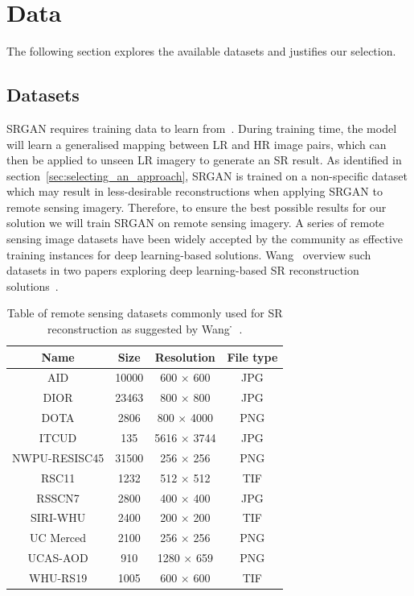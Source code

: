 \section{Data}
The following section explores the available datasets and justifies our selection.

\subsection{Datasets}
SRGAN requires training data to learn from~\cite{srgan}. During training time, the model will learn a generalised mapping between LR and HR image pairs, which can then be applied to unseen LR imagery to generate an SR result. As identified in section~\ref{sec:selecting_an_approach}, SRGAN is trained on a non-specific dataset which may result in less-desirable reconstructions when applying SRGAN to remote sensing imagery. Therefore, to ensure the best possible results for our solution we will train SRGAN on remote sensing imagery. A series of remote sensing image datasets have been widely accepted by the community as effective training instances for deep learning-based solutions. Wang \etal\ overview such datasets in two papers exploring deep learning-based SR reconstruction solutions~\cite{remoteSensingDeepLearningReview, remoteSensingGANsReview}.
\begin{table}[b]
    \centering
    \begin{tabular}{cccc}
        \toprule
        \textbf{Name} & \textbf{Size} & \textbf{Resolution} & \textbf{File type} \\
        \midrule
        AID & 10000 & 600 $\times$ 600 & JPG \\
        DIOR & 23463 & 800 $\times$ 800 & JPG \\
        DOTA & 2806 & 800 $\times$ 4000 & PNG \\
        ITCUD & 135 & 5616 $\times$ 3744 & JPG \\
        NWPU-RESISC45 & 31500 & 256 $\times$ 256 & PNG \\
        RSC11 & 1232 & 512 $\times$ 512 & TIF \\
        RSSCN7 & 2800 & 400 $\times$ 400 & JPG \\
        SIRI-WHU & 2400 & 200 $\times$ 200 & TIF \\
        UC Merced & 2100 & 256 $\times$ 256 & PNG \\
        UCAS-AOD & 910 & 1280 $\times$ 659 & PNG \\
        WHU-RS19 & 1005 & 600 $\times$ 600 & TIF \\
        \bottomrule
    \end{tabular}
    \caption{Table of remote sensing datasets commonly used for SR reconstruction as suggested by Wang \etal\.~\cite{remoteSensingDeepLearningReview,remoteSensingGANsReview}.}\label{table:datasets_table}
\end{table}

